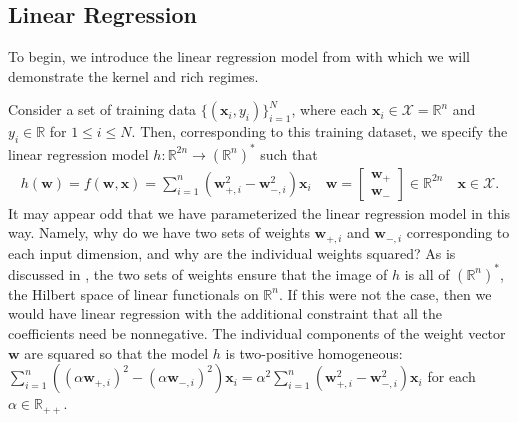 \documentclass{article}
\begin{document}
\subsection{Linear Regression}\label{linregmodel}

To begin, we introduce the linear regression model from \cite{woodworth2020kernel} with which we will demonstrate the kernel and rich regimes.

Consider a set of training data $\{ (\boldsymbol{x}_i, y_i)\}_{i=1}^N$, where each $\boldsymbol{x}_i \in \mathcal{X} = \mathbb{R}^n$ and $y_i \in \mathbb{R}$ for $1 \leq i \leq N$. Then, corresponding to this training dataset, we specify the linear regression model $h: \mathbb{R}^{2n} \rightarrow (\mathbb{R}^n)^*$ such that
\begin{align}\label{linreg}
    h(\boldsymbol{w}) = f(\boldsymbol{w}, \boldsymbol{x}) = \sum_{i=1}^n(\boldsymbol{w}_{+, i}^2 - \boldsymbol{w}_{-, i}^2)\boldsymbol{x}_i \quad 
    \boldsymbol{w} = 
    \begin{bmatrix}
        \boldsymbol{w}_+ \\
        \boldsymbol{w}_-
    \end{bmatrix} 
    \in \mathbb{R}^{2n} \quad \boldsymbol{x} \in \mathcal{X}.
\end{align}
It may appear odd that we have parameterized the linear regression model in this way. Namely, why do we have two sets of weights $\boldsymbol{w}_{+, i}$ and $\boldsymbol{w}_{-, i}$ corresponding to each input dimension, and why are the individual weights squared? As is discussed in \cite{woodworth2020kernel}, the two sets of weights ensure that the image of $h$ is all of $(\mathbb{R}^n)^*$, the Hilbert space of linear functionals on $\mathbb{R}^n$. If this were not the case, then we would have linear regression with the additional constraint that all the coefficients need be nonnegative. The individual components of the weight vector $\boldsymbol{w}$ are squared so that the model $h$ is two-positive homogeneous: $\sum_{i=1}^n((\alpha \boldsymbol{w}_{+, i})^2 - (\alpha \boldsymbol{w}_{-, i})^2)\boldsymbol{x}_i = \alpha^2\sum_{i=1}^n(\boldsymbol{w}_{+, i}^2 - \boldsymbol{w}_{-, i}^2)\boldsymbol{x}_i$ for each $\alpha \in \mathbb{R}_{++}$.
\end{document}
